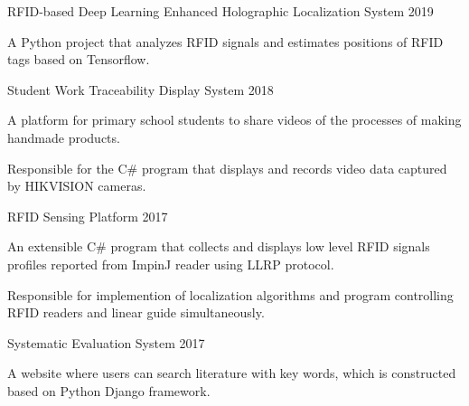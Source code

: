 \begin{cventries}
  \cventry
    {} %
    {RFID-based Deep Learning Enhanced Holographic Localization System} %
    {} %
    {2019} %
    {
      \begin{cvitems} %
        \item {A Python project that analyzes RFID signals and estimates positions of RFID tags based on Tensorflow.}
      \end{cvitems}
    }
    \EntryGap
  \cventry
    {} 
    {Student Work Traceability Display System} 
    {} 
    {2018} 
    {
      \begin{cvitems} 
        \item {A platform for primary school students to share videos of the processes of making handmade products.} 
        \item {Responsible for the C\# program that displays and records video data captured by HIKVISION cameras.}
      \end{cvitems}
    }
    \EntryGap
  \cventry
    {} 
    {RFID Sensing Platform} 
    {} 
    {2017} 
    {
      \begin{cvitems} 
        \item {An extensible C\# program that collects and displays low level RFID signals profiles reported from ImpinJ reader using LLRP protocol.}
        \item {Responsible for implemention of localization algorithms and program controlling RFID readers and linear guide simultaneously.}
      \end{cvitems}
    }
    \EntryGap
  \cventry
    {} 
    {Systematic Evaluation System} 
    {} 
    {2017} 
    {
      \begin{cvitems} 
        \item {A website where users can search literature with key words, which is constructed based on Python Django framework.}
      \end{cvitems}
    }
\end{cventries}
